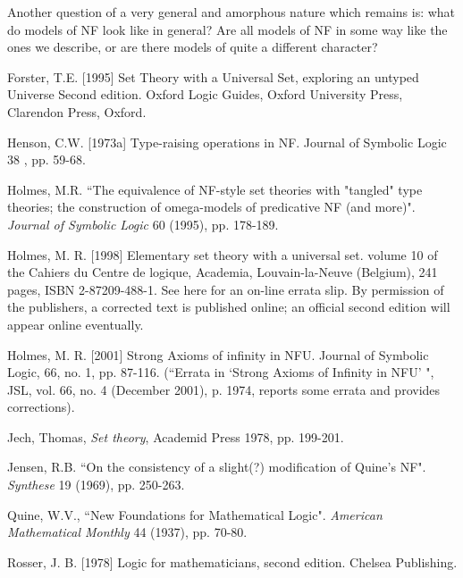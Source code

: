\documentclass[12pt]{article}
\begin{document}
Another question of a very general and amorphous nature which remains is:  what do models of NF look like in general?  Are all models of NF in some way like the ones we describe, or are there models of quite a different character?

\newpage

\begin{thebibliography}{99}





  Forster, T.E. [1995] 
Set Theory with a Universal Set, exploring an untyped Universe 
Second edition. Oxford Logic Guides, Oxford University Press, Clarendon Press, Oxford.



   Henson, C.W. [1973a] 
Type-raising operations in NF. 
Journal of Symbolic Logic 38 , pp. 59-68.

  Holmes, M.R.
``The equivalence of NF-style set theories with "tangled" type theories; the construction of omega-models of predicative NF (and more)". 
{\em Journal of Symbolic Logic\/} 60 (1995), pp. 178-189.

  Holmes, M. R. [1998] 
Elementary set theory with a universal set. 
volume 10 of the Cahiers du Centre de logique, Academia, Louvain-la-Neuve (Belgium), 241 pages, ISBN 2-87209-488-1. See here for an on-line errata slip. By permission of the publishers, a corrected text is published online; an official second edition will appear online eventually.

   Holmes, M. R. [2001]
Strong Axioms of infinity in NFU.
Journal of Symbolic Logic, 66, no. 1, pp. 87-116.  \newline(``Errata in `Strong
Axioms of Infinity in NFU' ", JSL, vol. 66, no. 4 (December
2001), p. 1974, reports some errata and provides corrections).

  Jech, Thomas, {\em Set theory}, Academid Press 1978, pp. 199-201.

  Jensen, R.B.
``On the consistency of a slight(?) modification of Quine's NF". 
{\em Synthese\/} 19 (1969), pp. 250-263.

  Quine, W.V.,
``New Foundations for Mathematical Logic". 
{\em American Mathematical Monthly\/} 44 (1937), pp. 70-80. 

  Rosser, J. B. [1978] 
Logic for mathematicians, second edition. 
Chelsea Publishing.


\end{thebibliography}
\end{document}
